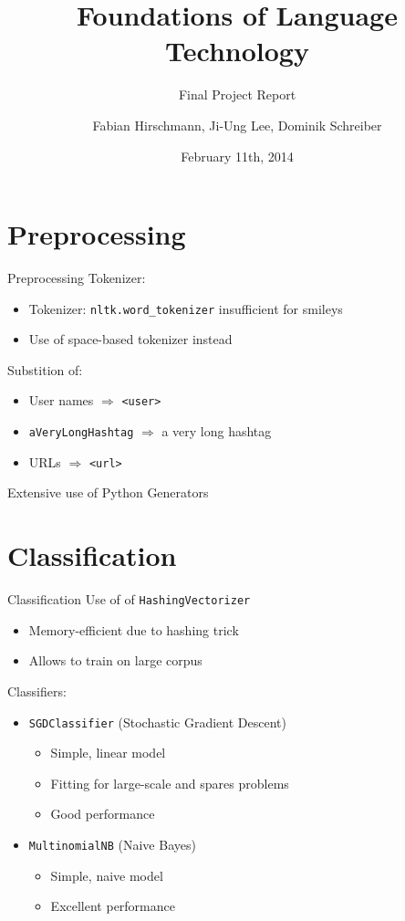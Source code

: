 \documentclass{beamer}
\title{Foundations of Language Technology}
\subtitle{Final Project Report}
\author{Fabian Hirschmann, Ji-Ung Lee, Dominik Schreiber}
\institute{Technische Universität Darmstadt}
\date{February 11th, 2014}
\begin{document}
\begin{frame}{}
    \titlepage
\end{frame}


\section{Preprocessing}
\begin{frame}{Preprocessing}
    Tokenizer:
    \begin{itemize}
        \item Tokenizer: \texttt{nltk.word\_tokenizer} insufficient for smileys
        \item Use of space-based tokenizer instead
    \end{itemize}

    Substition of:
    \begin{itemize}
        \item User names $\Rightarrow$ \texttt{<user>}
        \item \texttt{aVeryLongHashtag} $\Rightarrow$ a very long hashtag
        \item URLs $\Rightarrow$ \texttt{<url>}
    \end{itemize}
    
    Extensive use of Python Generators
\end{frame}

\section{Classification}
\begin{frame}{Classification}
    Use of of \texttt{HashingVectorizer}
    \begin{itemize}
        \item Memory-efficient due to hashing trick
        \item Allows to train on large corpus
    \end{itemize}
    Classifiers:
    \begin{itemize}
        \item \texttt{SGDClassifier} (Stochastic Gradient Descent)
            \begin{itemize}
                \item Simple, linear model
                \item Fitting for large-scale and spares problems
                \item Good performance
            \end{itemize}
        \item \texttt{MultinomialNB} (Naive Bayes)
            \begin{itemize}
                \item Simple, naive model
                \item Excellent performance
            \end{itemize}
    \end{itemize}
\end{frame}
\end{document}
